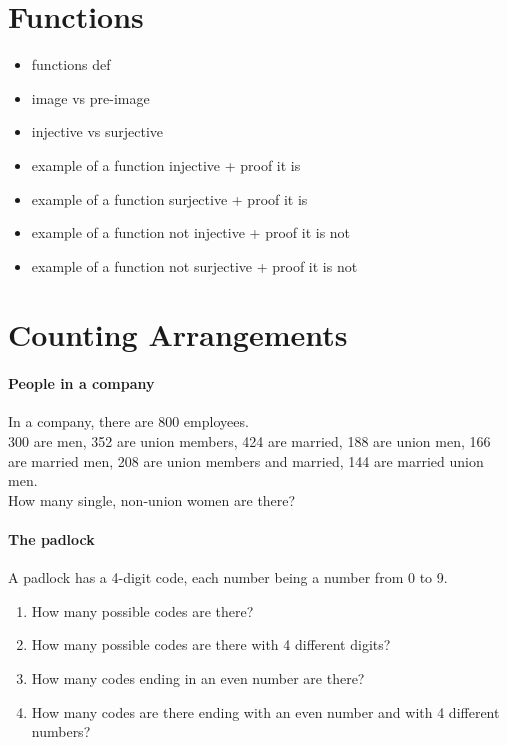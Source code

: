 \documentclass[a4paper,12pt]{article}
\providecommand{\tightlist}{\setlength{\itemsep}{0pt}\setlength{\parskip}{0pt}}
\begin{document}
	
	
	
	
	
	\section{Functions}
	
	\begin{itemize}
	\tightlist
	\item functions def
	\item image vs pre-image
	\item injective vs surjective
	\item example of a function injective + proof it is
	\item example of a function surjective + proof it is
	\item example of a function not injective + proof it is not
	\item example of a function not surjective + proof it is not
	\end{itemize}
	
	
	
	
	
	\section{Counting Arrangements}
	\paragraph{People in a company}
	In a company, there are 800 employees.\\
	300 are men, 352 are union members, 424 are married, 188 are union men, 166 are married men, 208 are union members and married, 144 are married union men.\\
	How many single, non-union women are there?
	
	\paragraph{The padlock}
	A padlock has a 4-digit code, each number being a number from 0 to 9.
	\begin{enumerate}
		\item How many possible codes are there?
		\item How many possible codes are there with 4 different digits?
		\item How many codes ending in an even number are there?
		\item How many codes are there ending with an even number and with 4 different numbers?
	\end{enumerate}
	
	
\end{document}
